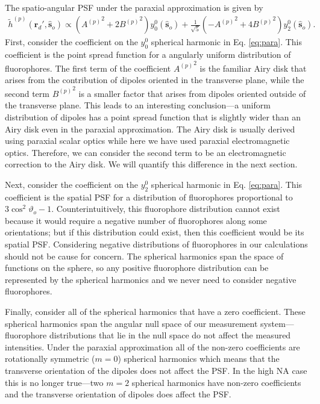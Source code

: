 \documentclass[11pt]{article}
\providecommand{\so}[1]{\mathbf{\hat{s}}_o}
\providecommand{\rd}[1]{\mathbf{r}_d}
\begin{document}
The spatio-angular PSF under the paraxial approximation is given by
\begin{align}
      \tilde{h}^{(p)}(\rd{}', \so{}) \propto \left({A^{(p)}}^2 + 2{B^{(p)}}^2\right)y_0^0(\so{}) + \frac{1}{\sqrt{5}}\left(-{A^{(p)}}^2 + 4{B^{(p)}}^2\right)y_2^{0}(\so{})\label{eq:para}.
\end{align}
First, consider the coefficient on the $y_0^0$ spherical harmonic in
Eq. \ref{eq:para}. This coefficient is the point spread function for a angularly
uniform distribution of fluorophores. The first term of the coefficient ${A^{(p)}}^2$
is the familiar Airy disk that arises from the contribution of dipoles oriented
in the transverse plane, while the second term ${B^{(p)}}^2$ is a smaller factor that
arises from dipoles oriented outside of the transverse plane. This leads to an
interesting conclusion---a uniform distribution of dipoles has a point spread
function that is slightly wider than an Airy disk even in the paraxial
approximation. The Airy disk is usually derived using paraxial scalar optics
while here we have used paraxial electromagnetic optics. Therefore, we can
consider the second term to be an electromagnetic correction to the Airy
disk. We will quantify this difference in the next section.

Next, consider the coefficient on the $y_2^0$ spherical harmonic in
Eq. \ref{eq:para}. This coefficient is the spatial PSF for a distribution of
fluorophores proportional to $3\cos^2\vartheta_o - 1$. Counterintuitively, this
fluorophore distribution cannot exist because it would require a negative number
of fluorophores along some orientations; but if this distribution could exist,
then this coefficient would be its spatial PSF. Considering negative
distributions of fluorophores in our calculations should not be cause for
concern. The spherical harmonics span the space of functions on the sphere, so
any positive fluorophore distribution can be represented by the spherical
harmonics and we never need to consider negative fluorophores.
    
Finally, consider all of the spherical harmonics that have a zero
coefficient. These spherical harmonics span the angular null space of our
measurement system---fluorophore distributions that lie in the null space do not
affect the measured intensities. Under the paraxial approximation all of the
non-zero coefficients are rotationally symmetric ($m=0$) spherical harmonics
which means that the transverse orientation of the dipoles does not affect the
PSF. In the high NA case this is no longer true---two $m=2$ spherical harmonics
have non-zero coefficients and the transverse orientation of dipoles does affect
the PSF.
\end{document}
